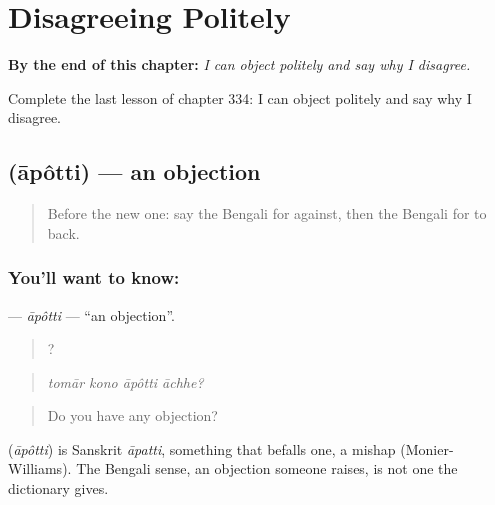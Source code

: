 
\chapter{Disagreeing Politely}
\label{ch:bn-disagreeing-politely}

\begin{chapteropening}
\textbf{By the end of this chapter:} \emph{I can object politely and say why I disagree.}

Complete the last lesson of chapter 334: I can object politely and say why I disagree.
\end{chapteropening}

\section[\texorpdfstring{\bn{আপত্তি} (āpôtti)}{আপত্তি (āpôtti)}]{ (āpôtti) — an objection}

\label{lesson:BN-C334-apotti}



\begin{quote}
Before the new one: say the Bengali for against, then the Bengali for to back.
\end{quote}

\subsection*{You'll want to know: }
\textbf{} — \emph{āpôtti} — \textquotedblleft{}an objection\textquotedblright{}.

\begin{quote}
   ?
\end{quote}

\begin{quote}
\emph{tomār kono āpôtti āchhe?}
\end{quote}

\begin{quote}
Do you have any objection?
\end{quote}

\begin{cousinweb}
\textbf{} (\emph{āpôtti}) is Sanskrit \emph{āpatti}, something that befalls one, a mishap (Monier-Williams). The Bengali sense, an objection someone raises, is not one the dictionary gives.
\end{cousinweb}

